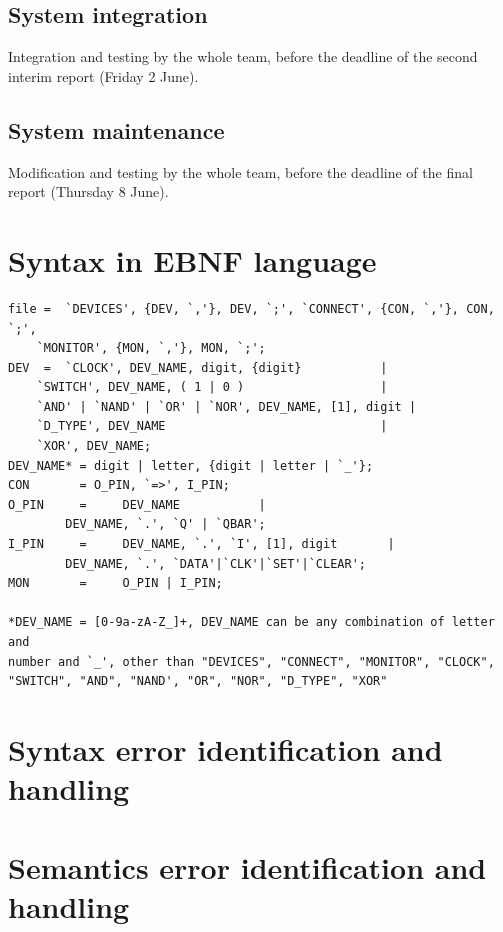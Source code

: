\documentclass[12pt]{article}
\begin{document}
\subsection{System integration}
Integration and testing by the whole team, before the deadline of the second interim report (Friday 2 June).

\subsection{System maintenance}
Modification and testing by the whole team, before the deadline of the final report (Thursday 8 June).

\section{Syntax in EBNF language}
\begin{lstlisting}[basicstyle=\small]
file =  `DEVICES', {DEV, `,'}, DEV, `;', `CONNECT', {CON, `,'}, CON, `;',
	`MONITOR', {MON, `,'}, MON, `;';
DEV  =  `CLOCK', DEV_NAME, digit, {digit}  			|
	`SWITCH', DEV_NAME, ( 1 | 0 )          			|
	`AND' | `NAND' | `OR' | `NOR', DEV_NAME, [1], digit	|
	`D_TYPE', DEV_NAME                  			|
	`XOR', DEV_NAME;
DEV_NAME* =	digit | letter, {digit | letter | `_'};
CON       =	O_PIN, `=>', I_PIN;
O_PIN     =  	DEV_NAME		   |
		DEV_NAME, `.', `Q' | `QBAR';
I_PIN     =  	DEV_NAME, `.', `I', [1], digit		 |
		DEV_NAME, `.', `DATA'|`CLK'|`SET'|`CLEAR';
MON       =     O_PIN | I_PIN;

*DEV_NAME = [0-9a-zA-Z_]+, DEV_NAME can be any combination of letter and 
number and `_', other than "DEVICES", "CONNECT", "MONITOR", "CLOCK", 
"SWITCH", "AND", "NAND', "OR", "NOR", "D_TYPE", "XOR"
\end{lstlisting}

\section{Syntax error identification and handling}

\section{Semantics error identification and handling}

\newpage
\end{document}
